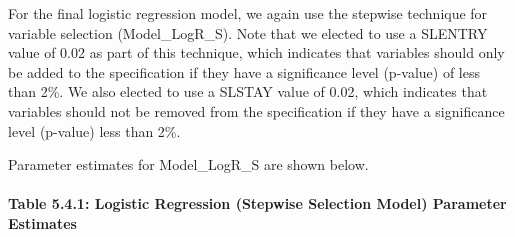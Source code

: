 \documentclass[]{article}
\let\oldparagraph\paragraph
\renewcommand{\paragraph}[1]{\oldparagraph{#1}\mbox{}}
\begin{document}
For the final logistic regression model, we again use the stepwise
technique for variable selection (Model\_LogR\_S). Note that we elected
to use a SLENTRY value of 0.02 as part of this technique, which
indicates that variables should only be added to the specification if
they have a significance level (p-value) of less than 2\%. We also
elected to use a SLSTAY value of 0.02, which indicates that variables
should not be removed from the specification if they have a significance
level (p-value) less than 2\%.

Parameter estimates for Model\_LogR\_S are shown below.

\paragraph{Table 5.4.1: Logistic Regression (Stepwise Selection Model)
Parameter
Estimates}\label{table-5.4.1-logistic-regression-stepwise-selection-model-parameter-estimates}
\end{document}
